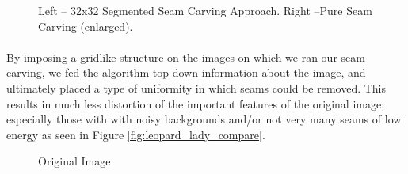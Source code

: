 \documentclass[conference]{acmsiggraph}
\begin{document}
\begin{figure}[ht]
    \caption{Left -- 32x32 Segmented Seam Carving Approach. Right --Pure Seam Carving (enlarged). }
    \label{fig:orgSeamCarvingComparision}
\end{figure}

\paragraph{}
By imposing a gridlike structure on the images on which we ran our seam carving, we fed the algorithm top down information about the image, and ultimately placed a type of uniformity in which seams could be removed. This results in much less distortion of the important features of the original image; especially those with with noisy backgrounds and/or not very many seams of low energy as seen in Figure \ref{fig:leopard_lady_compare}.

\begin{figure}[ht]       
    \centering
    \caption{Original Image}
    \label{fig:leopard_lady}     
\end{figure}
\end{document}
